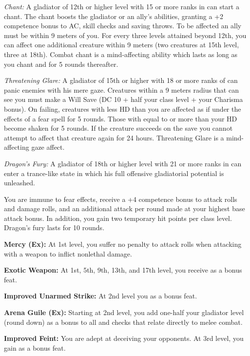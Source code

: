 \textit{Chant:} A gladiator of 12th or higher level with 15 or more ranks in  can start a chant. The chant boosts the gladiator or an ally's abilities, granting a +2 competence bonus to AC, skill checks and saving throws. To be affected an ally must be within 9 meters of you. For every three levels attained beyond 12th, you can affect one additional creature within 9 meters (two creatures at 15th level, three at 18th). Combat chant is a mind-affecting ability which lasts as long as you chant and for 5 rounds thereafter.

\textit{Threatening Glare:} A gladiator of 15th or higher with 18 or more ranks of  can panic enemies with his mere gaze. Creatures within a 9 meters radius that can see you must make a Will Save (DC 10 + half your class level + your Charisma bonus). On failing, creatures with less HD than you are affected as if under the effects of a fear spell for 5 rounds. Those with equal to or more than your HD become shaken for 5 rounds. If the creature succeeds on the save you cannot attempt to affect that creature again for 24 hours. Threatening Glare is a mind-affecting gaze affect.

\textit{Dragon's Fury:} A gladiator of 18th or higher level with 21 or more ranks in  can enter a trance-like state in which his full offensive gladiatorial potential is unleashed.

You are immune to fear effects, receive a +4 competence bonus to attack rolls and damage rolls, and an additional attack per round made at your highest base attack bonus. In addition, you gain two temporary hit points per class level. Dragon's fury lasts for 10 rounds.

\textbf{Mercy (Ex):} At 1st level, you suffer no penalty to attack rolls when attacking with a weapon to inflict nonlethal damage.

\textbf{Exotic Weapon:} At 1st, 5th, 9th, 13th, and 17th level, you receive  as a bonus feat.

\textbf{Improved Unarmed Strike:} At 2nd level you  as a bonus feat.

\textbf{Arena Guile (Ex):} Starting at 2nd level, you add one-half your gladiator level (round down) as a bonus to all  and  checks that relate directly to melee combat.

\textbf{Improved Feint:} You are adept at deceiving your opponents. At 3rd level, you gain  as a bonus feat.

